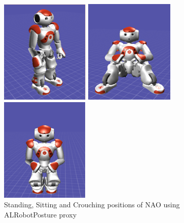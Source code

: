 \begin{figure}
	\centering 
	\begin{minipage}
		{.3 
		\textwidth} \centering 
		\includegraphics[height=5cm]{figures/content/nao-stand.png} 
	\end{minipage}
	\begin{minipage}
		{.3 
		\textwidth} \centering 
		\includegraphics[height=5cm]{figures/content/nao-sit.png} 
	\end{minipage}
	\begin{minipage}
		{.3 
		\textwidth} \centering 
		\includegraphics[height=5cm]{figures/content/nao-crouch.png} 
	\end{minipage}
	\caption{Standing, Sitting and Crouching positions of NAO using ALRobotPosture proxy} 
	\label{fg:nao:motion} 
\end{figure}
